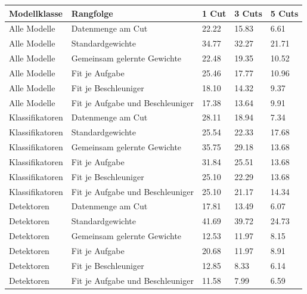 \begin{tabular}{@{}lllll@{}}
\toprule
Modellklasse & Rangfolge & 1 Cut & 3 Cuts & 5 Cuts \\
\midrule
Alle Modelle & Datenmenge am Cut & 22.22 & 15.83 & 6.61 \\
Alle Modelle & Standardgewichte & 34.77 & 32.27 & 21.71 \\
Alle Modelle & Gemeinsam gelernte Gewichte & 22.48 & 19.35 & 10.52 \\
Alle Modelle & Fit je Aufgabe & 25.46 & 17.77 & 10.96 \\
Alle Modelle & Fit je Beschleuniger & 18.10 & 14.32 & 9.37 \\
Alle Modelle & Fit je Aufgabe und Beschleuniger & 17.38 & 13.64 & 9.91 \\
Klassifikatoren & Datenmenge am Cut & 28.11 & 18.94 & 7.34 \\
Klassifikatoren & Standardgewichte & 25.54 & 22.33 & 17.68 \\
Klassifikatoren & Gemeinsam gelernte Gewichte & 35.75 & 29.18 & 13.68 \\
Klassifikatoren & Fit je Aufgabe & 31.84 & 25.51 & 13.68 \\
Klassifikatoren & Fit je Beschleuniger & 25.10 & 22.29 & 13.68 \\
Klassifikatoren & Fit je Aufgabe und Beschleuniger & 25.10 & 21.17 & 14.34 \\
Detektoren & Datenmenge am Cut & 17.81 & 13.49 & 6.07 \\
Detektoren & Standardgewichte & 41.69 & 39.72 & 24.73 \\
Detektoren & Gemeinsam gelernte Gewichte & 12.53 & 11.97 & 8.15 \\
Detektoren & Fit je Aufgabe & 20.68 & 11.97 & 8.91 \\
Detektoren & Fit je Beschleuniger & 12.85 & 8.33 & 6.14 \\
Detektoren & Fit je Aufgabe und Beschleuniger & 11.58 & 7.99 & 6.59 \\
\bottomrule
\end{tabular}
